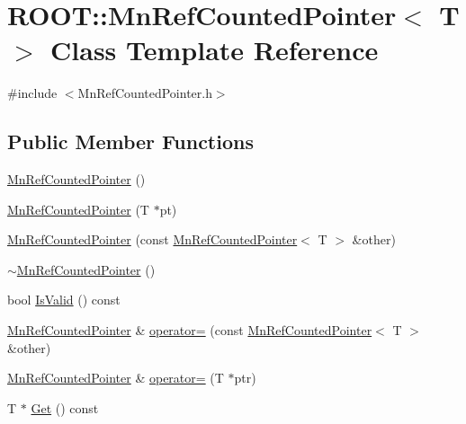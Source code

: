 \hypertarget{classROOT_1_1Minuit2_1_1MnRefCountedPointer}{}\section{R\+O\+OT\+:\+:Mn\+Ref\+Counted\+Pointer$<$ T $>$ Class Template Reference}
\label{classROOT_1_1Minuit2_1_1MnRefCountedPointer}


{\ttfamily \#include $<$Mn\+Ref\+Counted\+Pointer.\+h$>$}

\subsection*{Public Member Functions}
\begin{DoxyCompactItemize}
\item 
\mbox{\hyperlink{classROOT_1_1Minuit2_1_1MnRefCountedPointer_ab597b297b8bc186cf67a2c6874c2d169}{Mn\+Ref\+Counted\+Pointer}} ()
\item 
\mbox{\hyperlink{classROOT_1_1Minuit2_1_1MnRefCountedPointer_a854656023f22c0c856c12047a0a7c0e0}{Mn\+Ref\+Counted\+Pointer}} (T $\ast$pt)
\item 
\mbox{\hyperlink{classROOT_1_1Minuit2_1_1MnRefCountedPointer_aec0e2c9c47a86046d393bfb63399db7d}{Mn\+Ref\+Counted\+Pointer}} (const \mbox{\hyperlink{classROOT_1_1Minuit2_1_1MnRefCountedPointer}{Mn\+Ref\+Counted\+Pointer}}$<$ T $>$ \&other)
\item 
\mbox{\hyperlink{classROOT_1_1Minuit2_1_1MnRefCountedPointer_ae3bdd5d92c9c44bd3490954bca60fd47}{$\sim$\+Mn\+Ref\+Counted\+Pointer}} ()
\item 
bool \mbox{\hyperlink{classROOT_1_1Minuit2_1_1MnRefCountedPointer_a29a80f5f0dce4b10f42b04b3b3cb264c}{Is\+Valid}} () const
\item 
\mbox{\hyperlink{classROOT_1_1Minuit2_1_1MnRefCountedPointer}{Mn\+Ref\+Counted\+Pointer}} \& \mbox{\hyperlink{classROOT_1_1Minuit2_1_1MnRefCountedPointer_a6a7380791625cf84a89a3b4fa32b7029}{operator=}} (const \mbox{\hyperlink{classROOT_1_1Minuit2_1_1MnRefCountedPointer}{Mn\+Ref\+Counted\+Pointer}}$<$ T $>$ \&other)
\item 
\mbox{\hyperlink{classROOT_1_1Minuit2_1_1MnRefCountedPointer}{Mn\+Ref\+Counted\+Pointer}} \& \mbox{\hyperlink{classROOT_1_1Minuit2_1_1MnRefCountedPointer_a6867125c7f9d76199e7a6676eed5f682}{operator=}} (T $\ast$ptr)
\item 
T $\ast$ \mbox{\hyperlink{classROOT_1_1Minuit2_1_1MnRefCountedPointer_ae88bd272c286587bad6200c41c66909b}{Get}} () const

\end{DoxyCompactItemize}
